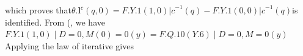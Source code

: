 \documentclass{article}
\begin{document}
which proves that$\theta . { \mathbf { l } } ^ { c } ( q, 0 ) = F . { Y . { 1 } ( 1, 0 ) | c } ^ { - 1 } ( q ) - F . { Y . { 1 } ( 0, 0 ) | c } ^ { - 1 } ( q )$is identified. From (, we have
$F . { Y . { 1 } ( 1, 0 ) \mid D = 0, M ( 0 ) = 0 } ( y ) = F . { Q . { 1 0 } ( Y . { 6 } ) \mid D = 0, M = 0 } ( y )$  Applying the law of iterative gives
\end{document}
